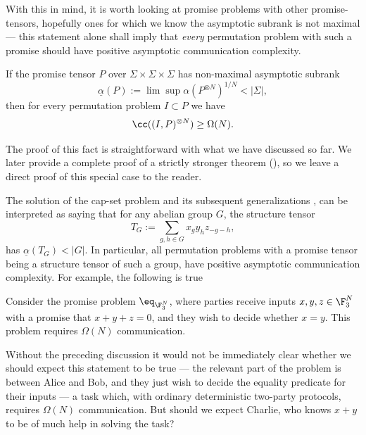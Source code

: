 With this in mind, it is worth looking at promise problems with other promise-tensors, hopefully ones for which we know the asymptotic subrank is not maximal --- this statement alone shall imply that \emph{every} permutation problem with such a promise should have positive asymptotic communication complexity.

\begin{fact}
\label{fct:group-promise-hard}
    If the promise tensor $P$ over $\Sigma \times \Sigma \times \Sigma$ has non-maximal asymptotic subrank
    \begin{equation*}
        \underline{\alpha}(P) := \lim \sup \alpha(P^{\otimes N})^{1/N} < |\Sigma|,
    \end{equation*}
    then for every permutation problem $I \subset P$ we have 
    \begin{equation*}
        \cc((I, P)^{\otimes N}) \geq \Omega(N).
    \end{equation*}
\end{fact}
The proof of this fact is straightforward with what we have discussed so far. We later provide a complete proof of a strictly stronger theorem (), so we leave a direct proof of this special case to the reader. 

The solution of the cap-set problem \cite{CLP17,ED17,T16} and its subsequent generalizations \cite{BCHGNSU17}, can be interpreted as saying that for any abelian group $G$, the structure tensor
\begin{equation*}
    T_G := \sum_{g,h \in G} x_{g} y_{h} z_{-g-h},
\end{equation*}
has $\underline{\alpha}(T_G) < |G|$. In particular, all permutation problems with a promise tensor being a structure tensor of such a group, have positive asymptotic communication complexity. For example, the following is true
\begin{corollary}
    Consider the promise problem $\eq_{\F_3^N}$, where parties receive inputs $x,y,z \in \F_3^N$ with a promise that $x+y+z = 0$, and they wish to decide whether $x=y$. This problem requires $\Omega(N)$ communication.
\end{corollary}

Without the preceding discussion it would not be immediately clear whether we should expect this statement to be true --- the relevant part of the problem is between Alice and Bob, and they just wish to decide the equality predicate for their inputs --- a task which, with ordinary deterministic two-party protocols, requires $\Omega(N)$ communication. But should we expect Charlie, who knows $x+y$ to be of much help in solving the task?

